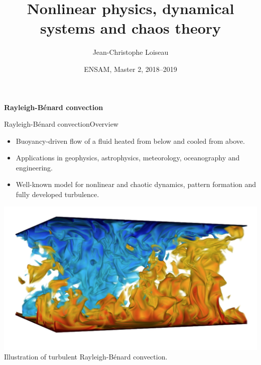 \documentclass[usenames,dvipsnames,svgnames,10pt,aspectratio=169]{beamer}
\title[Nonlinear Physics] %
{
	Nonlinear physics, dynamical \\ systems and chaos theory
}
\author[J.-Ch.~Loiseau] %
{
	Jean-Christophe Loiseau
}
\institute[unused]
{
	\url{jean-christophe.loiseau@ensam.eu} \\
	DynFluid, \\
	Arts et M\'etiers ParisTech, France
}
\date[unused]{ENSAM, Master 2, 2018--2019}
\begin{document}
\titleframe %


\begin{frame}[t, c]{}
	\centering
	\vspace{1cm}

	{\Large \textbf{Rayleigh-Bénard convection}}

	\bigskip

	{}

\end{frame}

\begin{frame}[t, c]{Rayleigh-Bénard convection}{Overview}
	\begin{minipage}{.48\textwidth}
		\begin{itemize}
			\item Buoyancy-driven flow of a fluid heated from below and cooled from above.

			\medskip

			\item Applications in geophysics, astrophysics, meteorology, oceanography and engineering.

			\medskip

			\item Well-known model for nonlinear and chaotic dynamics, pattern formation and fully developed turbulence.
		\end{itemize}
	\end{minipage}%
	\hfill
	\begin{minipage}{.48\textwidth}
		\centering
		\includegraphics[width=.95\textwidth]{turbulent_rayleigh_benard} \\

		{\small Illustration of turbulent Rayleigh-Bénard convection.}
	\end{minipage}

	\vspace{1cm}
\end{frame}
\end{document}

